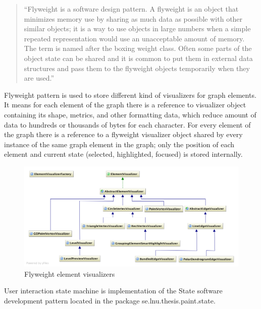 \begin{quotation}
``Flyweight is a software design pattern.
A flyweight is an object that minimizes memory use by sharing as much data as possible with other similar objects;
it is a way to use objects in large numbers when a simple repeated representation would use an unacceptable amount of memory.
The term is named after the boxing weight class.
Often some parts of the object state can be shared and it is common to put them in external data structures and pass them to
the flyweight objects temporarily when they are used.''~\cite{FLYWEIGHT}
\end{quotation}

Flyweight pattern is used to store different kind of visualizers for graph elements. It means for each element of the graph there is a reference to visualizer object containing its shape, metrics, and other formatting data, which reduce amount of data to hundreds or thousands of bytes for each character. For every element of the graph there is a reference to a flyweight visualizer object shared by every instance of the same graph element in the graph; only the position of each element and current state (selected, highlighted, focused) is stored internally.

\begin{figure}[h!]
\centering
\includegraphics[scale=0.41]{pictures/uml_visualizers.png}
\caption{Flyweight element visualizers}
\label{fig:uml_visualizers}
\end{figure}

User interaction state machine is implementation of the State software development pattern located in the package \textsf{se.lnu.thesis.paint.state}.

